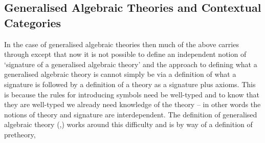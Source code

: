 \subsection{Generalised Algebraic Theories 	and Contextual Categories}
\note
In the case of generalised algebraic theories then much of the above carries through except that now 
it is not possible to define an independent notion of `signature of a generalised algebraic theory' and
the approach to defining what a generalised algebraic theory is cannot simply be via a definition of what a signature is followed by a definition 
of a theory  as a signature plus axioms. This is because the rules for introducing symbols need be well-typed and to know that
they are well-typed we already need knowledge of the theory -- in other words the notions of theory and signature are interdependent. 
The  definition of generalised algebraic theory (\cite{Cartmell78},\cite{Cartmell86})  works around this difficulty and is by way of 
a definition of pretheory, 
